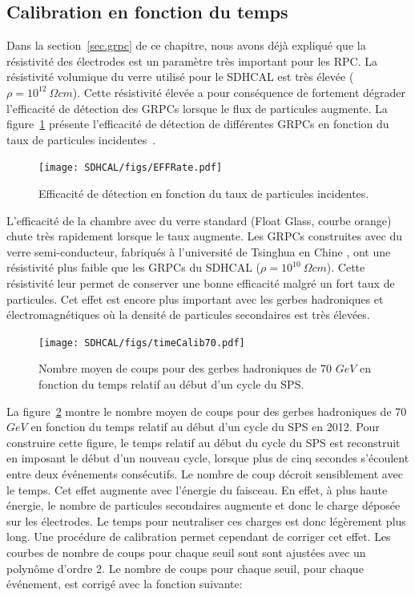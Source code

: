 \subsection{Calibration en fonction du temps}
\label{sec.timeCalib}
Dans la section~\ref{sec.grpc} de ce chapitre, nous avons déjà expliqué que la résistivité des électrodes est un paramètre très important pour les RPC. La résistivité volumique du verre utilisé pour le SDHCAL est très élevée ($\rho=10^{12}~\Omega cm$). Cette résistivité élevée a pour conséquence de fortement dégrader l'efficacité de détection des GRPCs lorsque le flux de particules augmente. La figure~\ref{fig:eff_vs_rate} présente l'efficacité de détection de différentes GRPCs en fonction du taux de particules incidentes~\cite{haddad}. 
\begin{figure}[!h]
  \begin{center}
    \texttt{[image: SDHCAL/figs/EFFRate.pdf]}
    \caption{Efficacité de détection en fonction du taux de particules incidentes.}
    \label{fig:eff_vs_rate}
  \end{center}
\end{figure}
L'efficacité de la chambre avec du verre standard (Float Glass, courbe orange) chute très rapidement lorsque le taux augmente. Les GRPCs construites avec du verre semi-conducteur, fabriqués à l'université de Tsinghua en Chine \cite{yi_wang}, ont une résistivité plus faible que les GRPCs du SDHCAL ($\rho=10^{10}~\Omega cm$). Cette résistivité leur permet de conserver une bonne efficacité malgré un fort taux de particules.
Cet effet est encore plus important avec les gerbes hadroniques et électromagnétiques où la densité de particules secondaires est très élevées.
\begin{figure}[!h]
  \begin{center}
    \texttt{[image: SDHCAL/figs/timeCalib70.pdf]}
    \caption{Nombre moyen de coups pour des gerbes hadroniques de 70 $GeV$ en fonction du temps relatif au début d'un cycle du SPS.}
    \label{fig:time_correction}
  \end{center}
\end{figure}
La figure~\ref{fig:time_correction} montre le nombre moyen de coups pour des gerbes hadroniques de 70 $GeV$ en fonction du temps relatif au début d'un cycle du SPS en 2012. Pour construire cette figure, le temps relatif au début du cycle du SPS est reconstruit en imposant le début d'un nouveau cycle, lorsque plus de cinq secondes s'écoulent entre deux événements consécutifs. Le nombre de coup décroit sensiblement avec le temps. Cet effet augmente avec l'énergie du faisceau. En effet, à plus haute énergie, le nombre de particules secondaires augmente et donc le charge déposée sur les électrodes. Le temps pour neutraliser ces charges est donc légèrement plus long. Une procédure de calibration permet cependant de corriger cet effet. Les courbes de nombre de coups pour chaque seuil sont sont ajustées avec un polynôme d'ordre 2. Le nombre de coups pour chaque seuil, pour chaque événement, est corrigé avec la fonction suivante:

